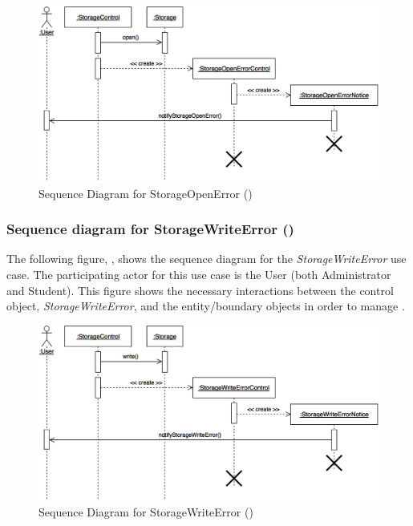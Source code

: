 \documentclass[12pt,letterpaper]{article}
\begin{document}
\begin{figure}[H]
	\centering{}
	\includegraphics[scale=0.27]{imgs/seq/storage-open-error.png}
	\caption[ - Sequence Diagram for StorageOpenError]{Sequence Diagram for StorageOpenError ()}
\end{figure}

\newpage{}

\subsubsection*{Sequence diagram for StorageWriteError ()}

The following figure, , shows the sequence diagram for the {\it StorageWriteError} use case. The participating actor for this use case is
the User (both Administrator and Student). This figure shows the necessary interactions between the control object, {\it StorageWriteError}, and the
entity/boundary objects in order to manage .

\begin{figure}[H]
	\centering{}
	\includegraphics[scale=0.27]{imgs/seq/storage-write-error.png}
	\caption[ - Sequence Diagram for StorageWriteError]{Sequence Diagram for StorageWriteError ()}
\end{figure}
\end{document}
